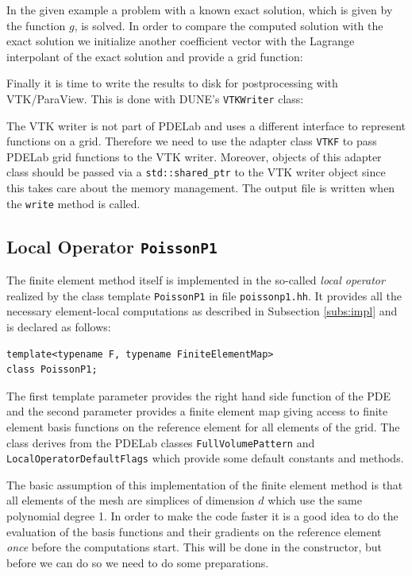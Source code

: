 \documentclass[a4paper,12pt]{article}
\begin{document}
In the given example a problem with a known exact solution,
which is given by the function $g$, is solved.
In order to compare the computed solution with the exact solution
we initialize another coefficient vector with the Lagrange interpolant
of the exact solution and provide a grid function:


Finally it is time to write the results to disk for postprocessing with
VTK/ParaView. This is done with DUNE's \lstinline{VTKWriter} class:

The VTK writer is not part of PDELab and uses a different interface
to represent functions on a grid. Therefore we need to use
the adapter class \lstinline{VTKF} to pass PDELab grid functions
to the VTK writer. Moreover, objects of this adapter class should
be passed via a \lstinline{std::shared_ptr} to the VTK writer object
since this takes care about the memory management.
The output file is written when the \lstinline{write} method is called.

\subsection{Local Operator \lstinline{PoissonP1}}

The finite element method itself is implemented in the 
so-called {\em local operator} realized by the class template \lstinline{PoissonP1}
in file \lstinline{poissonp1.hh}. It provides all the necessary
element-local computations as described in Subsection \ref{subs:impl}
and is declared as follows:
\begin{lstlisting}[basicstyle=\ttfamily\small,
frame=single,
backgroundcolor=\color{listingbg}]
template<typename F, typename FiniteElementMap>
class PoissonP1;
\end{lstlisting}
The first template parameter provides the right hand side function of
the PDE and the second parameter provides a finite element
map giving access to finite element basis functions on the
reference element for all elements of the grid. The class derives from the PDELab classes
\lstinline{FullVolumePattern} and \lstinline{LocalOperatorDefaultFlags}
which provide some default constants and methods.

The basic assumption of this implementation of the finite element
method is that all elements of the mesh are simplices of dimension $d$
which use the same polynomial degree 1.
In order to make the code faster it is a good idea to do
the evaluation of the basis functions and their gradients
on the reference element {\em once} before the computations start.
This will be done in the constructor, but before we can do so
we need to do some preparations.
\end{document}
